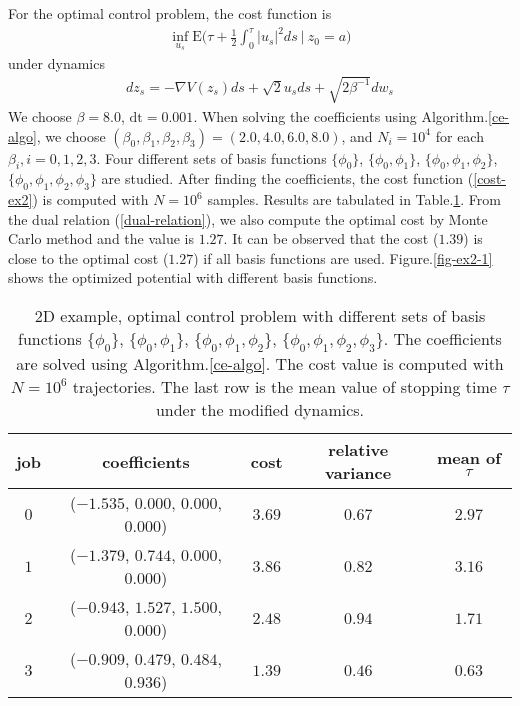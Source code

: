 \documentclass[final]{siamltex}
\begin{document}
For the optimal control problem, the cost function is 
\begin{align}
  \inf_{u_s} \mathrm{E}\Big(\tau + \frac{1}{2}\int_0^\tau |u_s|^2 ds ~\Big|~ z_0 = a \Big)
  \label{cost-ex2}
\end{align}
under dynamics
\begin{align}
  dz_s = - \nabla V(z_s) ds + \sqrt{2}u_s ds + \sqrt{2\beta^{-1}} dw_s
\end{align}
We choose $\beta = 8.0$, $\mbox{dt} = 0.001$. When solving the coefficients
using Algorithm.\ref{ce-algo}, we
choose $(\beta_0, \beta_1 , \beta_2, \beta_3) = (2.0, 4.0, 6.0, 8.0)$, and
$N_i = 10^4$ for each $\beta_i, i = 0, 1, 2, 3$. Four different sets of
basis functions $\{\phi_0\}$, $\{\phi_0, \phi_1\}$, $\{\phi_0, \phi_1,
\phi_2\}$, $\{\phi_0, \phi_1, \phi_2, \phi_3\}$ are studied. After finding the coefficients, the cost function (\ref{cost-ex2}) is computed with $N =
10^6$ samples. Results are tabulated in Table.\ref{tab-ex2-1}. From the dual relation
(\ref{dual-relation}), we also compute the optimal cost by Monte Carlo method
and the value is $1.27$. It can be observed that the cost ($1.39$) is close to the
optimal cost ($1.27$) if all basis functions are used. Figure.\ref{fig-ex2-1} shows the optimized potential with different basis functions.
\begin{table}
  \begin{tabular}{c|c|c|c|c}
    \hline
    job & coefficients & cost & relative variance & mean of $\tau$ \\
    \hline
    $0$ & ($-1.535$, $0.000$, $0.000$, $0.000$) & $3.69$ & $0.67$ & $2.97$ \\
    \hline
    $1$ & ($-1.379$, $0.744$, $0.000$, $0.000$) & $3.86$ & $0.82$ & $3.16$ \\
    \hline
    $2$ & ($-0.943$, $1.527$, $1.500$, $0.000$) & $2.48$ & $0.94$ & $1.71$ \\
    \hline
    $3$ & ($-0.909$, $0.479$, $0.484$, $0.936$) & $1.39$ & $0.46$ & $0.63$ \\
    \hline
  \end{tabular}
  \centering
  \caption{2D example, optimal control problem with different sets of basis
  functions $\{\phi_0\}$, $\{\phi_0, \phi_1\}$, $\{\phi_0, \phi_1, \phi_2\}$, $\{\phi_0, \phi_1, \phi_2, \phi_3\}$.
  The coefficients are solved using Algorithm.\ref{ce-algo}. The cost value is
  computed with $N=10^{6}$ trajectories.
The last row is the mean value of stopping time $\tau$ under the modified
dynamics. \label{tab-ex2-1}}
\end{table}
\end{document}
